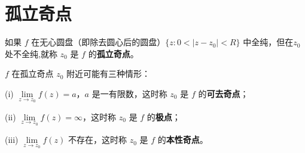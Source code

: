 \documentclass[../../main.tex]{subfiles}
\begin{document}
\section{孤立奇点}

\begin{definition}
如果 \( f \) 在无心圆盘（即除去圆心后的圆盘）\( \{ z: 0 < |z - z_0| < R \} \) 中全纯，但在$z_0$处不全纯,就称 \( z_0 \) 是 \( f \) 的\textbf{孤立奇点}。

\( f \) 在孤立奇点 \( z_0 \) 附近可能有三种情形：

(i) \( \lim\limits_{z \to z_0} f(z) = a \)，\( a \) 是一有限数，这时称 \( z_0 \) 是 \( f \) 的\textbf{可去奇点}；

(ii) \( \lim\limits_{z \to z_0} f(z) = \infty \)，这时称 \( z_0 \) 是 \( f \) 的\textbf{极点}；

(iii) \( \lim\limits_{z \to z_0} f(z) \) 不存在，这时称 \( z_0 \) 是 \( f \) 的\textbf{本性奇点}。
\end{definition}
\end{document}
